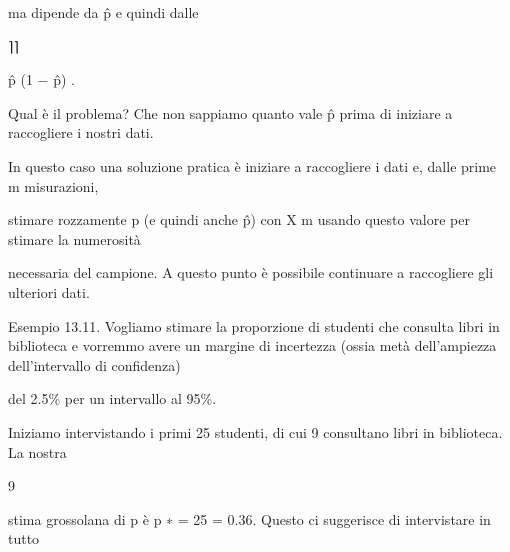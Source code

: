 \documentclass[a4paper,portrait,12pt]{article}
\begin{document}
\begin{flushleft}
ma dipende da p̂ e quindi dalle
\end{flushleft}





⌉⌉





\begin{flushleft}
p̂ (1 $-$ p̂) .
\end{flushleft}





\begin{flushleft}
Qual \`{e} il problema? Che non sappiamo quanto vale p̂ prima di iniziare a raccogliere i nostri dati.
\end{flushleft}


\begin{flushleft}
In questo caso una soluzione pratica \`{e} iniziare a raccogliere i dati e, dalle prime m misurazioni,
\end{flushleft}


\begin{flushleft}
stimare rozzamente p (e quindi anche p̂) con X m usando questo valore per stimare la numerosit\`{a}
\end{flushleft}


\begin{flushleft}
necessaria del campione. A questo punto \`{e} possibile continuare a raccogliere gli ulteriori dati.
\end{flushleft}


\begin{flushleft}
Esempio 13.11. Vogliamo stimare la proporzione di studenti che consulta libri in biblioteca e vorremmo avere un margine di incertezza (ossia met\`{a} dell'ampiezza dell'intervallo di confidenza)
\end{flushleft}


\begin{flushleft}
del 2.5\% per un intervallo al 95\%.
\end{flushleft}


\begin{flushleft}
Iniziamo intervistando i primi 25 studenti, di cui 9 consultano libri in biblioteca. La nostra
\end{flushleft}


9


\begin{flushleft}
stima grossolana di p \`{e} p ∗ = 25 = 0.36. Questo ci suggerisce di intervistare in tutto
\end{flushleft}
\end{document}
